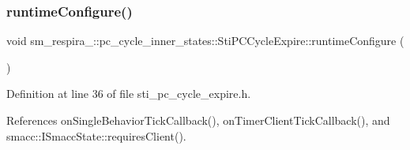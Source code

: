 \subsubsection{\texorpdfstring{runtime\+Configure()}{runtimeConfigure()}}
{\footnotesize\ttfamily void sm\+\_\+respira\+\_\+::pc\+\_\+cycle\+\_\+inner\+\_\+states\+::\+Sti\+P\+C\+Cycle\+Expire\+::runtime\+Configure (\begin{DoxyParamCaption}{ }\end{DoxyParamCaption})\hspace{0.3cm}{\ttfamily [inline]}}



Definition at line 36 of file sti\+\_\+pc\+\_\+cycle\+\_\+expire.\+h.



References on\+Single\+Behavior\+Tick\+Callback(), on\+Timer\+Client\+Tick\+Callback(), and smacc\+::\+I\+Smacc\+State\+::requires\+Client().


